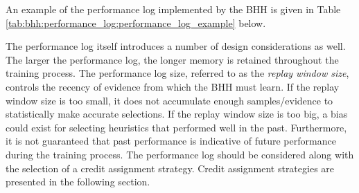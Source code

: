 An example of the performance log implemented by the \acs{BHH} is given in Table \ref{tab:bhh:performance_log:performance_log_example} below.

\begin{table}[htbp]
      \centering
      \caption{An example of the performance log implemented by the \acs{BHH}, showing the first 5 entities, their allocated heuristics and their resulting performance measurements for step 1 of the training process.}
      \label{tab:bhh:performance_log:performance_log_example}%
      \par\bigskip
\end{table}%

The performance log itself introduces a number of design considerations as well. The larger the performance log, the longer memory is retained throughout the training process. The performance log size, referred to as the \textit{replay window size}, controls the recency of evidence from which the \acs{BHH} must learn. If the replay window size is too small, it does not accumulate enough samples/evidence to statistically make accurate selections. If the replay window size is too big, a bias could exist for selecting heuristics that performed well in the past. Furthermore, it is not guaranteed that past performance is indicative of future performance during the training process. The performance log should be considered along with the selection of a credit assignment strategy. Credit assignment strategies are presented in the following section.


